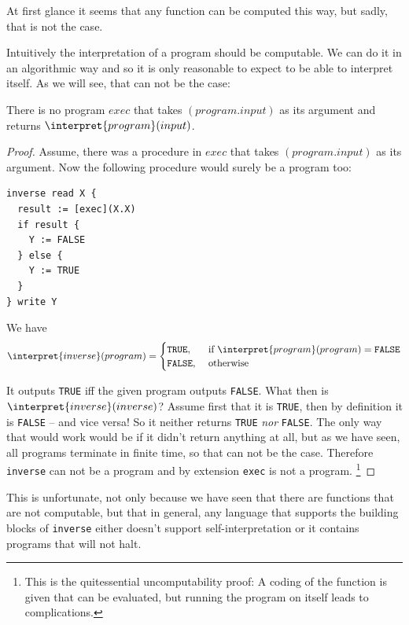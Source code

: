 
At first glance it seems that any function can be computed this way, but 
sadly, that is not the case.

Intuitively the interpretation of a \FOR program should be computable. We can 
do it in an algorithmic way and so it is only reasonable to expect \FOR to be 
able to interpret itself. As we will see, that can not be the case:

\begin{theorem}
	There is no \FOR program $exec$ that takes $(program.input)$ as its 
	argument and returns $\interpret{program}(input)$.
\end{theorem}
\begin{proof}
Assume, there was a procedure in \FOR $exec$ that takes $(program.input)$ as 
its argument. Now the following procedure would surely be a \FOR program too:

\begin{verbatim}
inverse read X {
  result := [exec](X.X)
  if result {
    Y := FALSE
  } else {
    Y := TRUE
  }
} write Y
\end{verbatim}

We have 
\[ \interpret{inverse}(program) = \begin{cases}
		\mathtt{TRUE}, &\text{ if }\interpret{program}(program) = \mathtt{FALSE} \\
		\mathtt{FALSE}, &\text{ otherwise }
	\end{cases} \]

It outputs {\tt TRUE} iff the given program outputs {\tt FALSE}. What then 
is $\interpret{inverse}(inverse)$? Assume first that it is 
{\tt TRUE}, then by definition it is {\tt FALSE} -- and vice versa! So it 
neither returns {\tt TRUE} {\em nor} {\tt FALSE}. The only way that would 
work would be if it didn't return anything at all, but as we have seen, all 
\FOR programs terminate in finite time, so that can not be the case. 
Therefore {\tt inverse} can not be a \FOR program and by extension {\tt exec} 
is not a \FOR program. 
\footnote{This is the quitessential uncomputability 
	proof: A coding of the function is given that can be evaluated, but running 
  the program on itself leads to complications.}
\end{proof}

This is unfortunate, not only because we have seen that there are functions 
that are not \FOR computable, but that in general, any language that supports 
the building blocks of {\tt inverse} either doesn't support 
self-interpretation or it contains programs that will not halt.

